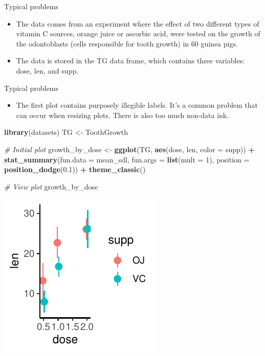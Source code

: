 \documentclass[
  ignorenonframetext,
]{beamer}
\newenvironment{Shaded}{\begin{snugshade}}{\end{snugshade}}
\newcommand{\AttributeTok}[1]{\textcolor[rgb]{0.13,0.29,0.53}{#1}}
\newcommand{\CommentTok}[1]{\textcolor[rgb]{0.56,0.35,0.01}{\textit{#1}}}
\newcommand{\DecValTok}[1]{\textcolor[rgb]{0.00,0.00,0.81}{#1}}
\newcommand{\FloatTok}[1]{\textcolor[rgb]{0.00,0.00,0.81}{#1}}
\newcommand{\FunctionTok}[1]{\textcolor[rgb]{0.13,0.29,0.53}{\textbf{#1}}}
\newcommand{\NormalTok}[1]{#1}
\newcommand{\OtherTok}[1]{\textcolor[rgb]{0.56,0.35,0.01}{#1}}
\newcommand{\SpecialCharTok}[1]{\textcolor[rgb]{0.81,0.36,0.00}{\textbf{#1}}}
\providecommand{\tightlist}{%
  \setlength{\itemsep}{0pt}\setlength{\parskip}{0pt}}
\begin{document}
\begin{frame}{Typical problems}
\label{typical-problems-1}
\begin{itemize}
\item
  The data comes from an experiment where the effect of two different
  types of vitamin C sources, orange juice or ascorbic acid, were tested
  on the growth of the odontoblasts (cells responsible for tooth growth)
  in 60 guinea pigs.
\item
  The data is stored in the TG data frame, which contains three
  variables: dose, len, and supp.
\end{itemize}
\end{frame}

\begin{frame}[fragile]{Typical problems}
\label{typical-problems-2}
\begin{itemize}
\tightlist
\item
  The first plot contains purposely illegible labels. It's a common
  problem that can occur when resizing plots. There is also too much
  non-data ink.
\end{itemize}


\begin{Shaded}
\begin{Highlighting}[]
\FunctionTok{library}\NormalTok{(datasets)}
\NormalTok{TG }\OtherTok{\textless{}{-}}\NormalTok{ ToothGrowth}

\CommentTok{\# Initial plot}
\NormalTok{growth\_by\_dose }\OtherTok{\textless{}{-}} \FunctionTok{ggplot}\NormalTok{(TG, }\FunctionTok{aes}\NormalTok{(dose, len, }\AttributeTok{color =}\NormalTok{ supp)) }\SpecialCharTok{+}
    \FunctionTok{stat\_summary}\NormalTok{(}\AttributeTok{fun.data =}\NormalTok{ mean\_sdl, }\AttributeTok{fun.args =} \FunctionTok{list}\NormalTok{(}\AttributeTok{mult =} \DecValTok{1}\NormalTok{),}
        \AttributeTok{position =} \FunctionTok{position\_dodge}\NormalTok{(}\FloatTok{0.1}\NormalTok{)) }\SpecialCharTok{+} \FunctionTok{theme\_classic}\NormalTok{()}

\CommentTok{\# View plot}
\NormalTok{growth\_by\_dose}
\end{Highlighting}
\end{Shaded}

\begin{center}\includegraphics[width=0.5\linewidth]{Figs/unnamed-chunk-119-1} \end{center}
\end{frame}
\end{document}
